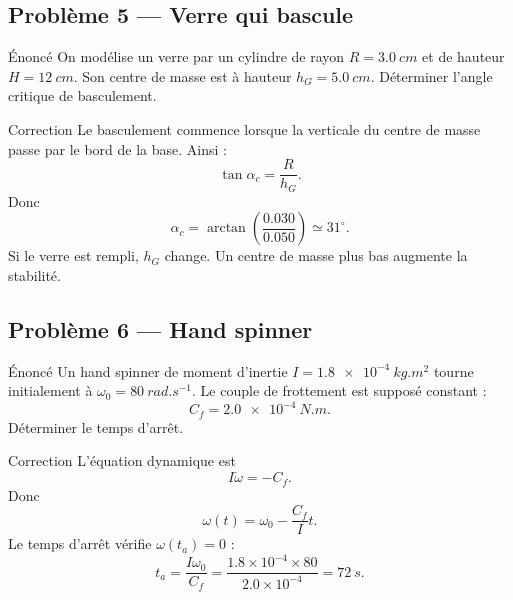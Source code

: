 \documentclass[11pt,a4paper]{article}
\begin{document}
\subsection{Problème 5 — Verre qui bascule}

\begin{exercisebox}{Énoncé}{}
On modélise un verre par un cylindre de rayon $R=\SI{3.0}{cm}$ et de hauteur $H=\SI{12}{cm}$.
Son centre de masse est à hauteur $h_G=\SI{5.0}{cm}$.
Déterminer l'angle critique de basculement.
\end{exercisebox}

\begin{center}
\end{center}

\begin{correctionbox}{Correction}{}
Le basculement commence lorsque la verticale du centre de masse passe par le bord de la base.
Ainsi :
\[
\tan\alpha_c=\frac{R}{h_G}.
\]
Donc
\[
\alpha_c=\arctan\left(\frac{0.030}{0.050}\right)
\simeq 31^\circ.
\]
Si le verre est rempli, $h_G$ change. Un centre de masse plus bas augmente la stabilité.
\end{correctionbox}

\subsection{Problème 6 — Hand spinner}

\begin{exercisebox}{Énoncé}{}
Un hand spinner de moment d'inertie $I=\SI{1.8e-4}{kg.m^2}$ tourne initialement à $\omega_0=\SI{80}{rad.s^{-1}}$.
Le couple de frottement est supposé constant :
\[
C_f=\SI{2.0e-4}{N.m}.
\]
Déterminer le temps d'arrêt.
\end{exercisebox}

\begin{correctionbox}{Correction}{}
L'équation dynamique est
\[
I\dot\omega=-C_f.
\]
Donc
\[
\omega(t)=\omega_0-\frac{C_f}{I}t.
\]
Le temps d'arrêt vérifie $\omega(t_a)=0$ :
\[
t_a=\frac{I\omega_0}{C_f}
=
\frac{1.8\times10^{-4}\times80}{2.0\times10^{-4}}
=\SI{72}{s}.
\]
\end{correctionbox}
\end{document}
